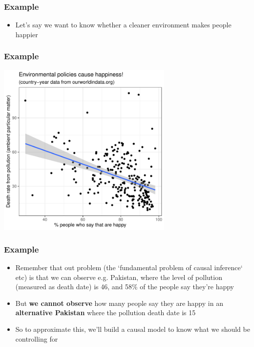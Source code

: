 \documentclass[aspectratio=43]{beamer}
\begin{document}
\begin{frame}
\frametitle{Example}
\centering

\begin{itemize}
\item Let's say we want to know whether a cleaner environment makes people happier
\end{itemize}

\end{frame}

\begin{frame}
\frametitle{Example}
\centering

\includegraphics[width = 0.65\textwidth]{../img/happiness_pollution}

\end{frame}

\begin{frame}
\frametitle{Example}
\centering

\begin{itemize}
  \item Remember that out problem (the `fundamental problem of causal inference` etc) is that we can observe e.g. Pakistan, where the level of pollution (measured as death date) is 46, and 58\% of the people say they're happy
  \item But \textbf{we cannot observe} how many people say they are happy in an \textbf{alternative Pakistan} where the pollution death date is 15
  \item So to approximate this, we'll build a causal model to know what we should be controlling for
\end{itemize}

\end{frame}
\end{document}

